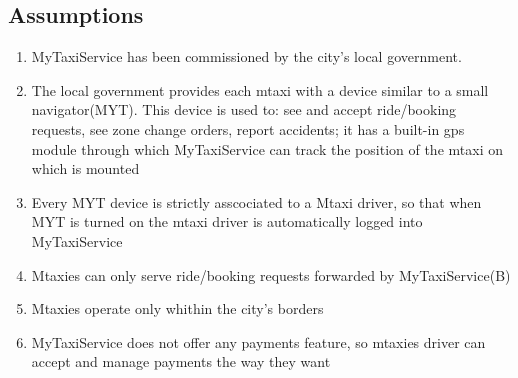 \documentclass[11pt,titlepage]{article} %
\begin{document}
  \subsection{Assumptions}
	\begin{enumerate}
	    \item MyTaxiService has been commissioned by the city's local government.

	    \item The local government provides each mtaxi with a device similar to a small navigator(MYT). This device is used
	      to: see and accept ride/booking requests, see zone change orders, report accidents; it has a built-in gps module through which MyTaxiService can
	      track the position of the mtaxi on which is mounted

	    \item Every MYT device is strictly asscociated to a Mtaxi driver, so that when MYT is turned on the mtaxi driver is automatically logged into MyTaxiService

	    \item Mtaxies can only serve ride/booking requests forwarded by MyTaxiService(B)

	    \item Mtaxies operate only whithin the city's borders

      \item MyTaxiService does not offer any payments feature, so mtaxies driver can accept and manage payments the way they want



	\end{enumerate}
\end{document}
